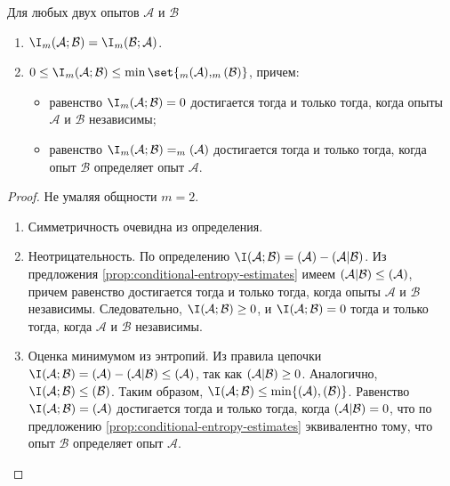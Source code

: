 \begin{proposition}
	Для любых двух опытов $\mathcal{A}$ и $\mathcal{B}$	
	\begin{enumerate}[compact]
    	\item \(\I_m(\mathcal{A};\mathcal{B}) = \I_m(\mathcal{B};\mathcal{A})\).
		\item \(0 \leq \I_m(\mathcal{A};\mathcal{B}) \leq \min\set{\H_m(\mathcal{A}), \H_m(\mathcal{B})}\), причем:
			\begin{itemize}[compact]
				\item равенство $\I_m(\mathcal{A};\mathcal{B}) = 0$ достигается тогда и только тогда, когда опыты $\mathcal{A}$ и $\mathcal{B}$ независимы; 
				\item равенство $\I_m(\mathcal{A};\mathcal{B}) = \H_m(\mathcal{A})$ достигается тогда и только тогда, когда опыт $\mathcal{B}$ определяет опыт $\mathcal{A}$.
			\end{itemize}
	\end{enumerate}
\end{proposition}
\begin{proof}
	Не умаляя общности $m=2$. 
	\begin{enumerate}
		\item Симметричность очевидна из определения.
		
		\item Неотрицательность. По определению $\I(\mathcal{A};\mathcal{B}) = \H(\mathcal{A}) - \H(\mathcal{A}|\mathcal{B})$. 
			Из предложения \ref{prop:conditional-entropy-estimates} имеем $\relax(\mathcal{A}|\mathcal{B}) \leq \relax(\mathcal{A})$, причем равенство достигается тогда и только тогда, когда опыты $\mathcal{A}$ и $\mathcal{B}$ независимы. Следовательно, $\I(\mathcal{A};\mathcal{B}) \geq 0$, и $\I(\mathcal{A};\mathcal{B}) = 0$ тогда и только тогда, когда $\mathcal{A}$ и $\mathcal{B}$ независимы.
		
		\item Оценка минимумом из энтропий. Из правила цепочки $\I(\mathcal{A};\mathcal{B}) = \H(\mathcal{A}) - \H(\mathcal{A}|\mathcal{B}) \leq \H(\mathcal{A})$, так как $\relax(\mathcal{A}|\mathcal{B}) \geq 0$. Аналогично, $\I(\mathcal{A};\mathcal{B}) \leq \H(\mathcal{B})$. Таким образом, $\I(\mathcal{A};\mathcal{B}) \leq \min\{\H(\mathcal{A}), \H(\mathcal{B})\}$. Равенство $\I(\mathcal{A};\mathcal{B}) = \H(\mathcal{A})$ достигается тогда и только тогда, когда $\relax(\mathcal{A}|\mathcal{B}) = 0$, что по предложению \ref{prop:conditional-entropy-estimates} эквивалентно тому, что опыт $\mathcal{B}$ определяет опыт $\mathcal{A}$.
	\end{enumerate}
\end{proof}

